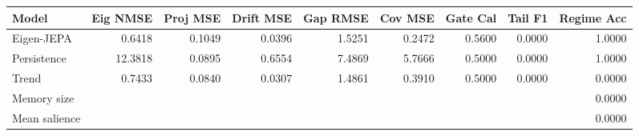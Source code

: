 \begin{tabular}{lrrrrrrrr}
\toprule
Model & Eig NMSE & Proj MSE & Drift MSE & Gap RMSE & Cov MSE & Gate Cal & Tail F1 & Regime Acc \\
\midrule
Eigen-JEPA & 0.6418 & 0.1049 & 0.0396 & 1.5251 & 0.2472 & 0.5600 & 0.0000 & 1.0000 \\
Persistence & 12.3818 & 0.0895 & 0.6554 & 7.4869 & 5.7666 & 0.5000 & 0.0000 & 1.0000 \\
Trend & 0.7433 & 0.0840 & 0.0307 & 1.4861 & 0.3910 & 0.5000 & 0.0000 & 0.0000 \\
\midrule
Memory size & \multicolumn{8}{r}{0.0000} \\
Mean salience & \multicolumn{8}{r}{0.0000} \\
\bottomrule
\end{tabular}